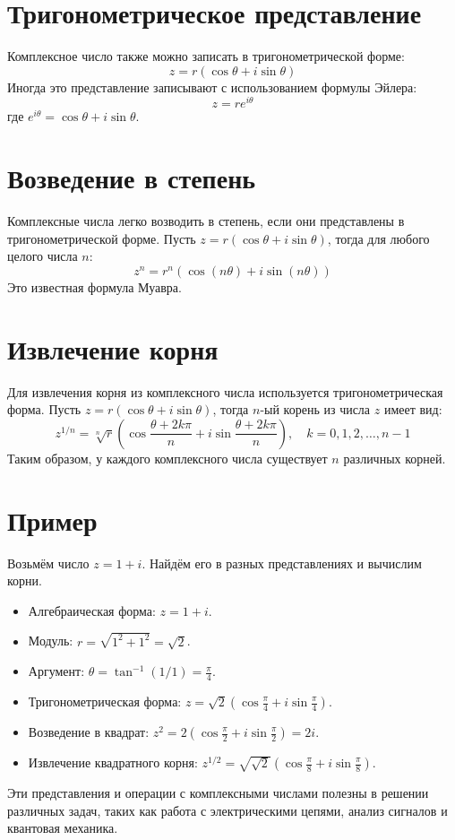 \documentclass[a4paper,12pt]{article}
\begin{document}
\section{Тригонометрическое представление}
Комплексное число также можно записать в тригонометрической форме:
\[
z = r \left( \cos \theta + i \sin \theta \right)
\]
Иногда это представление записывают с использованием формулы Эйлера:
\[
z = r e^{i \theta}
\]
где \( e^{i \theta} = \cos \theta + i \sin \theta \).

\section{Возведение в степень}
Комплексные числа легко возводить в степень, если они представлены в тригонометрической форме. Пусть \( z = r (\cos \theta + i \sin \theta) \), тогда для любого целого числа \( n \):
\[
z^n = r^n \left( \cos (n \theta) + i \sin (n \theta) \right)
\]
Это известная формула Муавра.

\section{Извлечение корня}
Для извлечения корня из комплексного числа используется тригонометрическая форма. Пусть \( z = r (\cos \theta + i \sin \theta) \), тогда \( n \)-ый корень из числа \( z \) имеет вид:
\[
z^{1/n} = \sqrt[n]{r} \left( \cos \frac{\theta + 2k\pi}{n} + i \sin \frac{\theta + 2k\pi}{n} \right), \quad k = 0, 1, 2, \dots, n-1
\]
Таким образом, у каждого комплексного числа существует \( n \) различных корней.

\section{Пример}
Возьмём число \( z = 1 + i \). Найдём его в разных представлениях и вычислим корни.
\begin{itemize}
    \item Алгебраическая форма: \( z = 1 + i \).
    \item Модуль: \( r = \sqrt{1^2 + 1^2} = \sqrt{2} \).
    \item Аргумент: \( \theta = \tan^{-1}(1/1) = \frac{\pi}{4} \).
    \item Тригонометрическая форма: \( z = \sqrt{2} \left( \cos \frac{\pi}{4} + i \sin \frac{\pi}{4} \right) \).
    \item Возведение в квадрат: \( z^2 = 2 \left( \cos \frac{\pi}{2} + i \sin \frac{\pi}{2} \right) = 2i \).
    \item Извлечение квадратного корня: \( z^{1/2} = \sqrt{\sqrt{2}} \left( \cos \frac{\pi}{8} + i \sin \frac{\pi}{8} \right) \).
\end{itemize}

Эти представления и операции с комплексными числами полезны в решении различных задач, таких как работа с электрическими цепями, анализ сигналов и квантовая механика.
\end{document}
